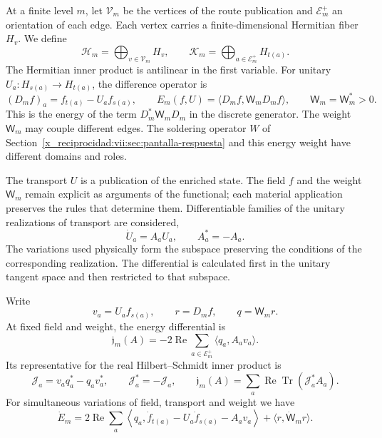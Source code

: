 At a finite level \(m\), let \(\mathcal V_m\) be the vertices of the
route publication and \(\mathcal E_m^+\) an orientation of each edge.
Each vertex carries a finite-dimensional Hermitian fiber \(H_v\).
We define
\[
 \mathcal H_m=\bigoplus_{v\in\mathcal V_m}H_v,\qquad
 \mathcal K_m=\bigoplus_{a\in\mathcal E_m^+}H_{t(a)}.
\]
The Hermitian inner product is antilinear in the first variable.
For unitary \(U_a:H_{s(a)}\to H_{t(a)}\), the difference operator is
\begin{equation}
 (D_mf)_a=f_{t(a)}-U_af_{s(a)},\qquad
 E_m(f,U)=\langle D_mf,\mathsf W_mD_mf\rangle,\qquad
 \mathsf W_m=\mathsf W_m^*>0.
 \label{x_reciprocidad:vii:eq:energia-memoria-discreta}
\end{equation}
This is the energy of the term \(D_m^*\mathsf W_mD_m\) in the discrete generator.
The weight \(\mathsf W_m\) may couple different edges. The soldering operator \(W\)
of Section~\ref{x_reciprocidad:vii:sec:pantalla-respuesta} and this energy
weight have different domains and roles.

The transport \(U\) is a publication of the enriched state. The field
\(f\) and the weight \(\mathsf W_m\) remain explicit as arguments
of the functional; each material application preserves the rules that
determine them. Differentiable families of the unitary realizations
of transport are considered,
\[
 \dot U_a=A_aU_a,\qquad A_a^*=-A_a.
\]
The variations used physically form the subspace preserving
the conditions of the corresponding realization. The differential is
calculated first in the unitary tangent space and then restricted
to that subspace.

\begin{proposition}
\label{x_reciprocidad:vii:prop:covector-memoria}
Write
\[
 v_a=U_af_{s(a)},\qquad r=D_mf,\qquad q=\mathsf W_mr.
\]
At fixed field and weight, the energy differential is
\begin{equation}
 \mathfrak j_m(A)=-2\operatorname{Re}
       \sum_{a\in\mathcal E_m^+}\langle q_a,A_av_a\rangle .
 \label{x_reciprocidad:vii:eq:covector-memoria}
\end{equation}
Its representative for the real Hilbert--Schmidt inner product is
\begin{equation}
 \mathcal J_a=v_aq_a^*-q_av_a^*,\qquad
 \mathcal J_a^*=-\mathcal J_a,\qquad
 \mathfrak j_m(A)=
 \sum_a\operatorname{Re}\operatorname{Tr}(\mathcal J_a^*A_a).
 \label{x_reciprocidad:vii:eq:representante-corriente-discreta}
\end{equation}
For simultaneous variations of field, transport and weight we have
\begin{equation}
 \dot E_m=
 2\operatorname{Re}\sum_a
 \left\langle q_a,\dot f_{t(a)}-U_a\dot f_{s(a)}-A_av_a\right\rangle
 +\langle r,\dot{\mathsf W}_mr\rangle .
 \label{x_reciprocidad:vii:eq:variacion-completa-memoria}
\end{equation}
\end{proposition}

